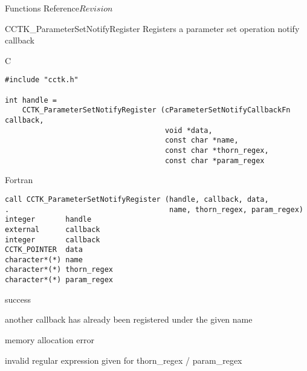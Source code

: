 \begin{cactuspart}{ Functions Reference}{}{$Revision$}
\begin{FunctionDescription}{CCTK\_ParameterSetNotifyRegister}
\label{CCTK-ParameterSetNotifyRegister}
Registers a parameter set operation notify callback

\begin{SynopsisSection}
\begin{Synopsis}{C}
\begin{verbatim}
#include "cctk.h"

int handle =
    CCTK_ParameterSetNotifyRegister (cParameterSetNotifyCallbackFn callback,
                                     void *data,
                                     const char *name,
                                     const char *thorn_regex,
                                     const char *param_regex
\end{verbatim}
\end{Synopsis}
\begin{Synopsis}{Fortran}
\begin{verbatim}
call CCTK_ParameterSetNotifyRegister (handle, callback, data,
.                                     name, thorn_regex, param_regex)
integer       handle
external      callback
integer       callback
CCTK_POINTER  data
character*(*) name
character*(*) thorn_regex
character*(*) param_regex
\end{verbatim}
\end{Synopsis}
\end{SynopsisSection}

\begin{ResultSection}
\begin{Result}{0}
success
\end{Result}
\begin{Result}{-1}
another callback has already been registered under the given name
\end{Result}
\begin{Result}{-2}
memory allocation error
\end{Result}
\begin{Result}{-3}
invalid regular expression given for thorn\_regex / param\_regex
\end{Result}
\end{ResultSection}


\end{FunctionDescription}
\end{cactuspart}
